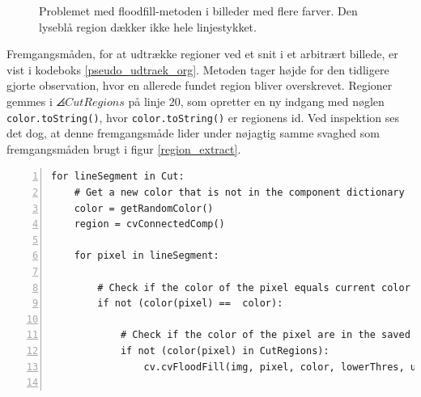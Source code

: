 {\begin{figure}[p]
    \setlength\fboxsep{0pt}
    \setlength\fboxrule{0.5pt}
    \centering
    \caption[]{Problemet med floodfill-metoden i billeder med flere
    farver. Den lyseblå region dækker ikke hele linjestykket.}
    \label{floodfill_taerskel_problem}
\end{figure}

Fremgangsmåden, for at udtrække regioner ved et snit i et arbitrært
billede, er vist i kodeboks \ref{pseudo_udtraek_org}. Metoden tager
højde for den tidligere gjorte observation, hvor en allerede fundet
region bliver overskrevet. Regioner gemmes i $\angles{CutRegions}$ på
linje 20, som opretter en ny indgang med nøglen
\texttt{color.toString()}, hvor \texttt{color.toString()} er regionens
id. Ved inspektion ses det dog, at denne fremgangsmåde lider under
nøjagtig samme svaghed som fremgangsmåden brugt i figur
\ref{region_extract}.

\begin{lstlisting}[caption={Original pseudokode til udtrækning af
    regioner. Denne kan returnere den samme region flere
    gange.},captionpos=b,label={pseudo_udtraek_org},numbers=left,
    frame=single, breaklines=false, float=h]
for lineSegment in Cut:
    # Get a new color that is not in the component dictionary
    color = getRandomColor()
    region = cvConnectedComp()

    for pixel in lineSegment:

        # Check if the color of the pixel equals current color
        if not (color(pixel) ==  color):

            # Check if the color of the pixel are in the saved regions
            if not (color(pixel) in CutRegions):
                cv.cvFloodFill(img, pixel, color, lowerThres, upperThres, region)


\end{lstlisting}}
